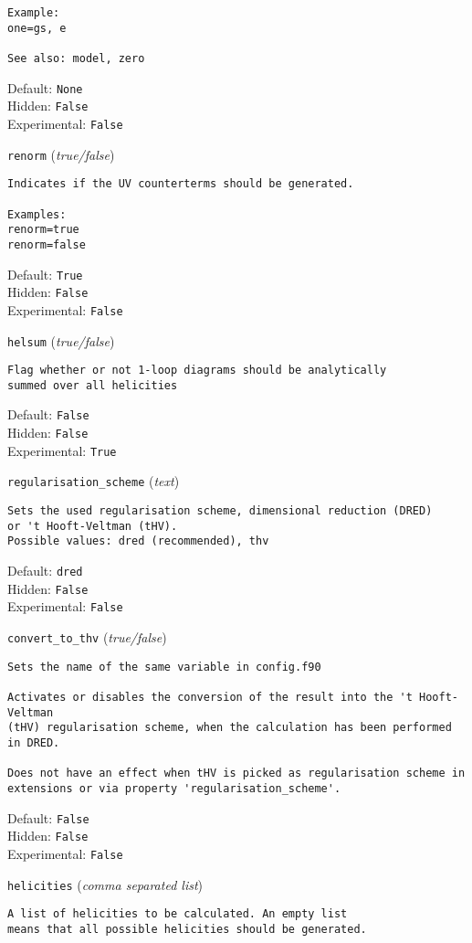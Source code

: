\begin{basedescript}{\desclabelstyle{\pushlabel}}
\begin{verbatim}
Example:
one=gs, e

See also: model, zero
\end{verbatim}
Default: \verb|None|
\\Hidden: \verb|False|
\\Experimental: \verb|False|
\\\item[\colorbox{gray!30}{\texttt{renorm}}] (\textit{true/false})
\begin{verbatim}
Indicates if the UV counterterms should be generated.

Examples:
renorm=true
renorm=false
\end{verbatim}
Default: \verb|True|
\\Hidden: \verb|False|
\\Experimental: \verb|False|
\\\item[\colorbox{gray!30}{\texttt{helsum}}] (\textit{true/false})
\begin{verbatim}
Flag whether or not 1-loop diagrams should be analytically
summed over all helicities
\end{verbatim}
Default: \verb|False|
\\Hidden: \verb|False|
\\Experimental: \verb|True|
\\\item[\colorbox{gray!30}{\texttt{regularisation\_scheme}}] (\textit{text})
\begin{verbatim}
Sets the used regularisation scheme, dimensional reduction (DRED)
or 't Hooft-Veltman (tHV).
Possible values: dred (recommended), thv
\end{verbatim}
Default: \verb|dred|
\\Hidden: \verb|False|
\\Experimental: \verb|False|
\\\item[\colorbox{gray!30}{\texttt{convert\_to\_thv}}] (\textit{true/false})
\begin{verbatim}
Sets the name of the same variable in config.f90

Activates or disables the conversion of the result into the 't Hooft-Veltman
(tHV) regularisation scheme, when the calculation has been performed in DRED.

Does not have an effect when tHV is picked as regularisation scheme in
extensions or via property 'regularisation_scheme'.
\end{verbatim}
Default: \verb|False|
\\Hidden: \verb|False|
\\Experimental: \verb|False|
\\\item[\colorbox{gray!30}{\texttt{helicities}}] (\textit{comma separated list})
\begin{verbatim}
A list of helicities to be calculated. An empty list
means that all possible helicities should be generated.


\end{verbatim}
\end{basedescript}

